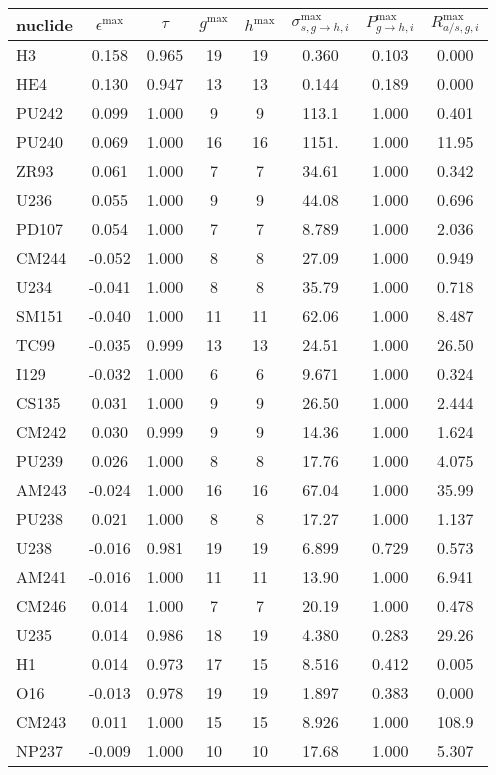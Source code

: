 \begin{tabular}{|l|ccccccc|}
\hline
nuclide & $\epsilon^{\max}$ & $\tau$ & $g^{\max}$ & $h^{\max}$ & $\sigma_{s,g\to h,i}^{\max}$ & $P_{g\to h,i}^{\max}$ & $R_{a/s,g,i}^{\max}$\\
\hline
H3 & 0.158 & 0.965 & 19 & 19 & 0.360 & 0.103 & 0.000\\
HE4 & 0.130 & 0.947 & 13 & 13 & 0.144 & 0.189 & 0.000\\
PU242 & 0.099 & 1.000 & 9 & 9 & 113.1 & 1.000 & 0.401\\
PU240 & 0.069 & 1.000 & 16 & 16 & 1151. & 1.000 & 11.95\\
ZR93 & 0.061 & 1.000 & 7 & 7 & 34.61 & 1.000 & 0.342\\
U236 & 0.055 & 1.000 & 9 & 9 & 44.08 & 1.000 & 0.696\\
PD107 & 0.054 & 1.000 & 7 & 7 & 8.789 & 1.000 & 2.036\\
CM244 & -0.052 & 1.000 & 8 & 8 & 27.09 & 1.000 & 0.949\\
U234 & -0.041 & 1.000 & 8 & 8 & 35.79 & 1.000 & 0.718\\
SM151 & -0.040 & 1.000 & 11 & 11 & 62.06 & 1.000 & 8.487\\
TC99 & -0.035 & 0.999 & 13 & 13 & 24.51 & 1.000 & 26.50\\
I129 & -0.032 & 1.000 & 6 & 6 & 9.671 & 1.000 & 0.324\\
CS135 & 0.031 & 1.000 & 9 & 9 & 26.50 & 1.000 & 2.444\\
CM242 & 0.030 & 0.999 & 9 & 9 & 14.36 & 1.000 & 1.624\\
PU239 & 0.026 & 1.000 & 8 & 8 & 17.76 & 1.000 & 4.075\\
AM243 & -0.024 & 1.000 & 16 & 16 & 67.04 & 1.000 & 35.99\\
PU238 & 0.021 & 1.000 & 8 & 8 & 17.27 & 1.000 & 1.137\\
U238 & -0.016 & 0.981 & 19 & 19 & 6.899 & 0.729 & 0.573\\
AM241 & -0.016 & 1.000 & 11 & 11 & 13.90 & 1.000 & 6.941\\
CM246 & 0.014 & 1.000 & 7 & 7 & 20.19 & 1.000 & 0.478\\
U235 & 0.014 & 0.986 & 18 & 19 & 4.380 & 0.283 & 29.26\\
H1 & 0.014 & 0.973 & 17 & 15 & 8.516 & 0.412 & 0.005\\
O16 & -0.013 & 0.978 & 19 & 19 & 1.897 & 0.383 & 0.000\\
CM243 & 0.011 & 1.000 & 15 & 15 & 8.926 & 1.000 & 108.9\\
NP237 & -0.009 & 1.000 & 10 & 10 & 17.68 & 1.000 & 5.307\\

\end{tabular}

